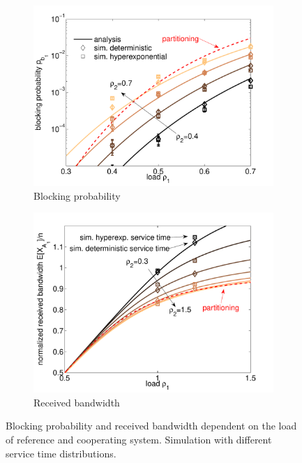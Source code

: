 \begin{figure}[tb]
\centering
\begin{subfigure}{.49\textwidth}
 \centering
 \includegraphics[width=\linewidth]{aggregation/performance_model/figures/m2_n20_rho2_sim}
 \caption{Blocking probability}
 \label{fig:m2_n20_rho2_sim}
\end{subfigure}%
\begin{subfigure}{.49\textwidth}
 \centering
 \includegraphics[width=\linewidth]{aggregation/performance_model/figures/bw_n20_rho2_sim}
 \caption{Received bandwidth}
 \label{fig:bw_n20_rho2_sim}
\end{subfigure}
\caption{Blocking probability and received bandwidth dependent on the load of reference and cooperating system. Simulation with different service time distributions.}
\label{fig:n20_rho2_sim}
\end{figure}

